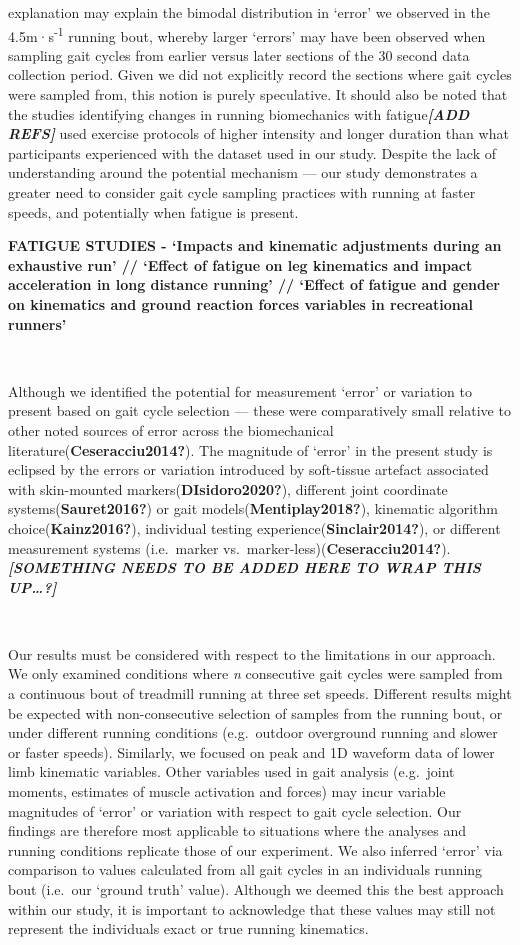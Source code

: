 \documentclass[]{elsarticle} %
\begin{document}
explanation may explain the bimodal distribution in `error' we observed
in the 4.5m·s\textsuperscript{-1} running bout, whereby larger `errors'
may have been observed when sampling gait cycles from earlier versus
later sections of the 30 second data collection period. Given we did not
explicitly record the sections where gait cycles were sampled from, this
notion is purely speculative. It should also be noted that the studies
identifying changes in running biomechanics with
fatigue\textbf{\emph{{[}ADD REFS{]}}} used exercise protocols of higher
intensity and longer duration than what participants experienced with
the dataset used in our study. Despite the lack of understanding around
the potential mechanism --- our study demonstrates a greater need to
consider gait cycle sampling practices with running at faster speeds,
and potentially when fatigue is present.

\textbf{FATIGUE STUDIES - `Impacts and kinematic adjustments during an
exhaustive run' // `Effect of fatigue on leg kinematics and impact
acceleration in long distance running' // `Effect of fatigue and gender
on kinematics and ground reaction forces variables in recreational
runners'}

~

Although we identified the potential for measurement `error' or
variation to present based on gait cycle selection --- these were
comparatively small relative to other noted sources of error across the
biomechanical literature(\textbf{Ceseracciu2014?}). The magnitude of
`error' in the present study is eclipsed by the errors or variation
introduced by soft-tissue artefact associated with skin-mounted
markers(\textbf{DIsidoro2020?}), different joint coordinate
systems(\textbf{Sauret2016?}) or gait models(\textbf{Mentiplay2018?}),
kinematic algorithm choice(\textbf{Kainz2016?}), individual testing
experience(\textbf{Sinclair2014?}), or different measurement systems
(i.e.~marker vs.~marker-less)(\textbf{Ceseracciu2014?}).
\textbf{\emph{{[}SOMETHING NEEDS TO BE ADDED HERE TO WRAP THIS
UP\ldots?{]}}}

~

Our results must be considered with respect to the limitations in our
approach. We only examined conditions where \emph{n} consecutive gait
cycles were sampled from a continuous bout of treadmill running at three
set speeds. Different results might be expected with non-consecutive
selection of samples from the running bout, or under different running
conditions (e.g.~outdoor overground running and slower or faster
speeds). Similarly, we focused on peak and 1D waveform data of lower
limb kinematic variables. Other variables used in gait analysis
(e.g.~joint moments, estimates of muscle activation and forces) may
incur variable magnitudes of `error' or variation with respect to gait
cycle selection. Our findings are therefore most applicable to
situations where the analyses and running conditions replicate those of
our experiment. We also inferred `error' via comparison to values
calculated from all gait cycles in an individuals running bout (i.e.~our
`ground truth' value). Although we deemed this the best approach within
our study, it is important to acknowledge that these values may still
not represent the individuals exact or true running kinematics.
\end{document}
